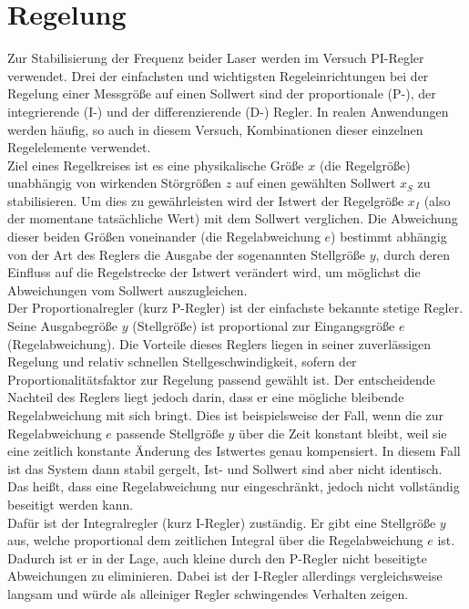 \documentclass[
class=book,
accentcolor=1b,
custommargins=geometry,
fontsize=11pt,
thesis={type=Versuchsanleitung},
ruledheaders=all,
headline=false,
instbox=false,
marginpar=false,
title=small,
ignore-missing-data=true,
twoside=false,
logofile=apqdesign/tuda_logo.pdf,
pdfa=false %
]{apqpub}
\begin{document}
			\section{Regelung}			
			Zur Stabilisierung der Frequenz beider Laser werden im Versuch PI-Regler verwendet. 
			Drei der einfachsten und wichtigsten Regeleinrichtungen bei der Regelung einer Messgröße auf einen Sollwert sind der proportionale (P-), der integrierende (I-) und der differenzierende (D-) Regler.
			In realen Anwendungen werden häufig, so auch in diesem Versuch, Kombinationen dieser einzelnen Regelelemente verwendet.\\			
			Ziel eines Regelkreises ist es eine physikalische Größe $x$ (die Regelgröße) unabhängig von wirkenden Störgrößen $z$ auf einen gewählten Sollwert $x_S$ zu stabilisieren.
			Um dies zu gewährleisten wird der Istwert der Regelgröße $x_I$ (also der momentane tatsächliche Wert) mit dem Sollwert verglichen. 
			Die Abweichung dieser beiden Größen voneinander (die Regelabweichung $e$) bestimmt abhängig von der Art des Reglers die Ausgabe der sogenannten Stellgröße $y$, durch deren Einfluss auf die Regelstrecke der Istwert verändert wird, um möglichst die Abweichungen vom Sollwert auszugleichen.\\ 
			Der Proportionalregler (kurz P-Regler) ist der einfachste bekannte stetige Regler. 
			Seine Ausgabegröße $y$ (Stellgröße) ist proportional zur Eingangsgröße $e$ (Regelabweichung). 
			Die Vorteile dieses Reglers liegen in seiner zuverlässigen Regelung und relativ schnellen Stellgeschwindigkeit, sofern der Proportionalitätsfaktor zur Regelung passend gewählt ist. 
			Der entscheidende Nachteil des Reglers liegt jedoch darin, dass er eine mögliche bleibende Regelabweichung mit sich bringt.		
			Dies ist beispielsweise der Fall, wenn die zur Regelabweichung $e$ passende Stellgröße $y$ über die Zeit konstant bleibt, weil sie eine zeitlich konstante Änderung des Istwertes genau kompensiert.
			In diesem Fall ist das System dann stabil gergelt, Ist- und Sollwert sind aber nicht identisch.
			Das heißt, dass eine Regelabweichung nur eingeschränkt, jedoch nicht vollständig beseitigt werden kann.\\
			Dafür ist der Integralregler (kurz I-Regler) zuständig. 
			Er gibt eine Stellgröße $y$ aus, welche proportional dem zeitlichen Integral über die Regelabweichung $e$ ist. 
			Dadurch ist er in der Lage, auch kleine durch den P-Regler nicht beseitigte Abweichungen zu eliminieren.
			Dabei ist der I-Regler allerdings vergleichsweise langsam und würde als alleiniger Regler schwingendes Verhalten zeigen. \\
\end{document}
